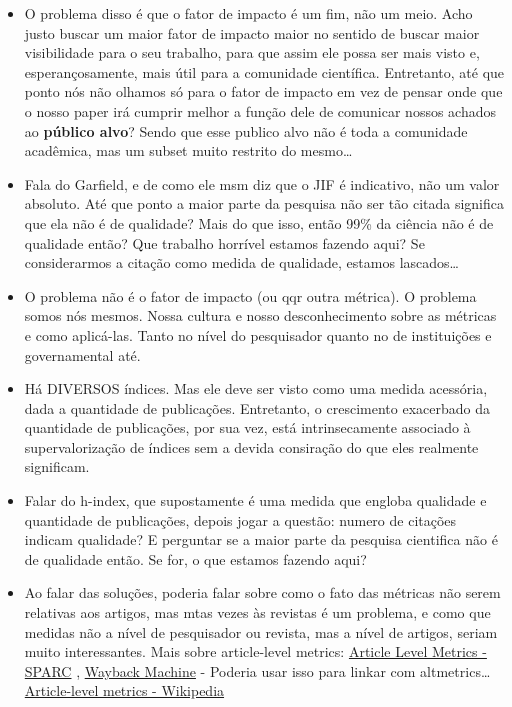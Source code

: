 \documentclass[11pt]{article}
\begin{document}
\begin{itemize}
\item O problema disso é que o fator de impacto é um fim, não um meio. Acho justo buscar um maior fator de impacto maior no sentido de buscar maior visibilidade para o seu trabalho, para que assim ele possa ser mais visto e, esperançosamente, mais útil para a comunidade científica. Entretanto, até que ponto nós não olhamos só para o fator de impacto em vez de pensar onde que o nosso paper irá cumprir melhor a função dele de comunicar nossos achados ao \textbf{público alvo}? Sendo que esse publico alvo não é toda a comunidade acadêmica, mas um subset muito restrito do mesmo\ldots{}
\item Fala do Garfield, e de como ele msm diz que o JIF é indicativo, não um valor absoluto. Até que ponto a maior parte da pesquisa não ser tão citada significa que ela não é de qualidade? Mais do que isso, então 99\% da ciência não é de qualidade então? Que trabalho horrível estamos fazendo aqui? Se considerarmos a citação como medida de qualidade, estamos lascados\ldots{}
\item O problema não é o fator de impacto (ou qqr outra métrica). O problema somos nós mesmos. Nossa cultura e nosso desconhecimento sobre as métricas e como aplicá-las. Tanto no nível do pesquisador quanto no de instituições e governamental até.
\item Há DIVERSOS índices. Mas ele deve ser visto como uma medida acessória, dada a quantidade de publicações. Entretanto, o crescimento exacerbado da quantidade de publicações, por sua vez, está intrinsecamente associado à supervalorização de índices sem a devida consiração do que eles realmente significam.
\item Falar do h-index, que supostamente é uma medida que engloba qualidade e quantidade de publicações, depois jogar a questão: numero de citações indicam qualidade? E perguntar se a maior parte da pesquisa cientifica não é de qualidade então. Se for, o que estamos fazendo aqui?
\item Ao falar das soluções, poderia falar sobre como o fato das métricas não serem relativas aos artigos, mas mtas vezes às revistas é um problema, e como que medidas não a nível de pesquisador ou revista, mas a nível de artigos, seriam muito interessantes. Mais sobre article-level metrics:  \href{https://sparcopen.org/our-work/article-level-metrics/\#:\~:text=Article\%2DLevel\%20Metrics\%20(ALMs),proxy\%20for\%20that\%20publication's\%20importance.}{Article Level Metrics - SPARC} ,   \href{https://web.archive.org/web/20140313155739/http://www.sparc.arl.org/sites/default/files/sparc-alm-primer.pdf}{Wayback Machine} - Poderia usar isso para linkar com altmetrics\ldots{} \href{https://en.wikipedia.org/wiki/Article-level\_metrics}{Article-level metrics - Wikipedia}

\end{itemize}
\end{document}
